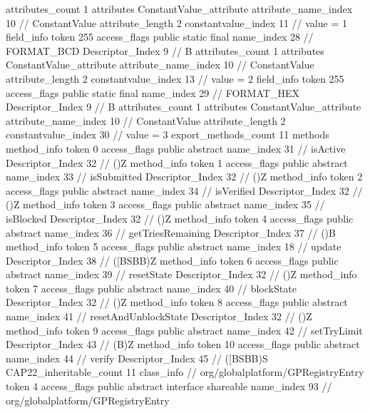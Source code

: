 {{{{{				attributes_count	1
				attributes {
				ConstantValue_attribute {
					attribute_name_index	10		// ConstantValue
					attribute_length	2
					constantvalue_index	11		// value = 1
				}
				}
			}
			field_info {
				token	255
				access_flags	public static final
				name_index	28		// FORMAT_BCD
				Descriptor_Index	9		// B
				attributes_count	1
				attributes {
				ConstantValue_attribute {
					attribute_name_index	10		// ConstantValue
					attribute_length	2
					constantvalue_index	13		// value = 2
				}
				}
			}
			field_info {
				token	255
				access_flags	public static final
				name_index	29		// FORMAT_HEX
				Descriptor_Index	9		// B
				attributes_count	1
				attributes {
				ConstantValue_attribute {
					attribute_name_index	10		// ConstantValue
					attribute_length	2
					constantvalue_index	30		// value = 3
				}
				}
			}
			}
			export_methods_count	11
			methods {
				method_info {
					token	0
					access_flags	public abstract
					name_index	31		// isActive
					Descriptor_Index	32		// ()Z
				}
				method_info {
					token	1
					access_flags	public abstract
					name_index	33		// isSubmitted
					Descriptor_Index	32		// ()Z
				}
				method_info {
					token	2
					access_flags	public abstract
					name_index	34		// isVerified
					Descriptor_Index	32		// ()Z
				}
				method_info {
					token	3
					access_flags	public abstract
					name_index	35		// isBlocked
					Descriptor_Index	32		// ()Z
				}
				method_info {
					token	4
					access_flags	public abstract
					name_index	36		// getTriesRemaining
					Descriptor_Index	37		// ()B
				}
				method_info {
					token	5
					access_flags	public abstract
					name_index	18		// update
					Descriptor_Index	38		// ([BSBB)Z
				}
				method_info {
					token	6
					access_flags	public abstract
					name_index	39		// resetState
					Descriptor_Index	32		// ()Z
				}
				method_info {
					token	7
					access_flags	public abstract
					name_index	40		// blockState
					Descriptor_Index	32		// ()Z
				}
				method_info {
					token	8
					access_flags	public abstract
					name_index	41		// resetAndUnblockState
					Descriptor_Index	32		// ()Z
				}
				method_info {
					token	9
					access_flags	public abstract
					name_index	42		// setTryLimit
					Descriptor_Index	43		// (B)Z
				}
				method_info {
					token	10
					access_flags	public abstract
					name_index	44		// verify
					Descriptor_Index	45		// ([BSBB)S
				}
			}
			CAP22_inheritable_count	11
		}
		class_info {		// org/globalplatform/GPRegistryEntry
			token	4
			access_flags	public abstract interface shareable
			name_index	93		// org/globalplatform/GPRegistryEntry
}}}
